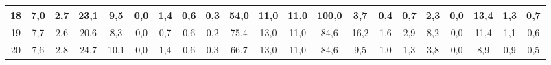 \begin{sidewaystable}[]
\begin{tabular}{|c|c|c|c|c|c|c|c|c|c|c|c|c|c|c|c|c|c|c|c|c|}
    18 & 7,0                                              & 2,7                                              & 23,1                                             & 9,5                                              & 0,0                                              & 1,4                                              & 0,6                                              & 0,3                                              & 54,0                                            & 11,0                                            & 11,0                                            & 100,0                                           & 3,7                                             & 0,4                                             & 0,7                                             & 2,3                                             & 0,0                                             & 13,4                                             & 1,3                                              &  0,7                                               \\ \hline
    19 & 7,7                                              & 2,6                                              & 20,6                                             & 8,3                                              & 0,0                                              & 0,7                                              & 0,6                                              & 0,2                                              & 75,4                                            & 13,0                                            & 11,0                                            & 84,6                                            & 16,2                                            & 1,6                                             & 2,9                                             & 8,2                                             & 0,0                                             & 11,4                                             & 1,1                                              &  0,6                                               \\ \hline
    20 & 7,6                                              & 2,8                                              & 24,7                                             & 10,1                                             & 0,0                                              & 1,4                                              & 0,6                                              & 0,3                                              & 66,7                                            & 13,0                                            & 11,0                                            & 84,6                                            & 9,5                                             & 1,0                                             & 1,3                                             & 3,8                                             & 0,0                                             & 8,9                                              & 0,9                                              &  0,5                                               \\ \hline

\end{tabular}
\end{sidewaystable}
